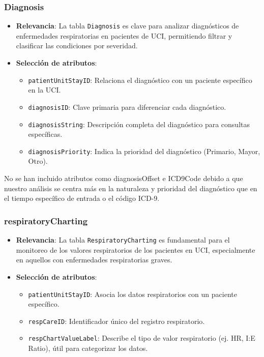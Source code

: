 \documentclass[12pt, a4paper, twoside]{article}
\begin{document}
	\subsubsection{Diagnosis} 
	
	\begin{itemize}
		\item \textbf{Relevancia}: La tabla \texttt{Diagnosis} es clave para analizar diagnósticos de enfermedades respiratorias en pacientes de UCI, permitiendo filtrar y clasificar las condiciones por severidad.
		
		\item \textbf{Selección de atributos}:
		\begin{itemize}
			\item \texttt{patientUnitStayID}: Relaciona el diagnóstico con un paciente específico en la UCI.
			\item \texttt{diagnosisID}: Clave primaria para diferenciar cada diagnóstico.
			\item \texttt{diagnosisString}: Descripción completa del diagnóstico para consultas específicas.
			\item \texttt{diagnosisPriority}: Indica la prioridad del diagnóstico (Primario, Mayor, Otro).
		\end{itemize}
	\end{itemize}
	
	No se han incluido atributos como diagnosisOffset e ICD9Code debido a que nuestro análisis se centra más en la naturaleza y prioridad del diagnóstico que en el tiempo específico de entrada o el código ICD-9. \cite{eICU2024}
	
	\subsubsection{respiratoryCharting}
	
	\begin{itemize}
		\item \textbf{Relevancia}: La tabla \texttt{RespiratoryCharting} es fundamental para el monitoreo de los valores respiratorios de los pacientes en UCI, especialmente en aquellos con enfermedades respiratorias graves.
		
		\item \textbf{Selección de atributos}:
		\begin{itemize}
			\item \texttt{patientUnitStayID}: Asocia los datos respiratorios con un paciente específico.
			\item \texttt{respCareID}: Identificador único del registro respiratorio.
			\item \texttt{respChartValueLabel}: Describe el tipo de valor respiratorio (ej. HR, I:E Ratio), útil para categorizar los datos.
		\end{itemize}
		
	\end{itemize}
	
\end{document}
